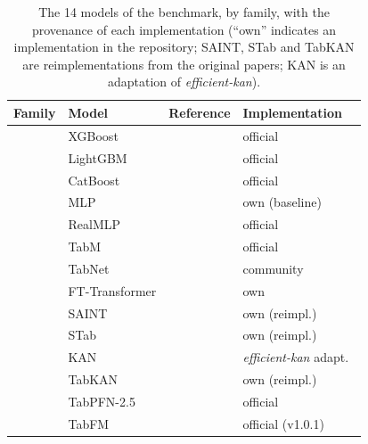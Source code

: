 \begin{table}[htb]
\centering
\caption[The 14 models of the benchmark, by family]{The 14 models of
the benchmark, by family, with the provenance of each
implementation (``own'' indicates an implementation in the
repository; SAINT, STab and TabKAN are reimplementations from the
original papers; KAN is an adaptation of \emph{efficient-kan}).}
\label{tab:modelos}
\footnotesize
\setlength{\tabcolsep}{3pt}
\begin{tabular}{llll}
\toprule
Family & Model & Reference & Implementation \\
\midrule
{}
 & XGBoost        & \citet{chen2016}          & official \\
 & LightGBM       & \citet{ke2017}            & official \\
 & CatBoost       & \citet{prokhorenkova2018} & official \\
\midrule
{}
 & MLP            & \citet{gorishniy2021}     & own (baseline) \\
 & RealMLP        & \citet{realmlp2024}       & official \\
 & TabM           & \citet{tabm2025}          & official \\
 & TabNet         & \citet{arik2021}          & community \\
 & FT-Transformer & \citet{gorishniy2021}     & own \\
 & SAINT          & \citet{somepalli2021}     & own (reimpl.) \\
 & STab           & \citet{stab-ref}          & own (reimpl.) \\
 & KAN            & \citet{kan2024}           & \emph{efficient-kan} adapt.\ \\
 & TabKAN         & \citet{tabkan2025}        & own (reimpl.) \\
\midrule
{}
 & TabPFN-2.5     & \citet{hollmann2025, priorlabs2025} & official \\
 & TabFM          & \citet{tabfm2026}         & official (v1.0.1) \\
\bottomrule
\end{tabular}
\end{table}

